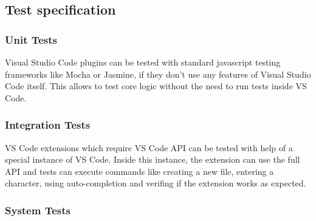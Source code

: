 \subsection{Test specification}

\subsubsection{Unit Tests}
Visual Studio Code plugins can be tested with standard javascript testing frameworks like Mocha or Jasmine, if they don't use any features of Visual Studio Code itself. This allows to test core logic without the need to run tests inside VS Code.


\subsubsection{Integration Tests}
VS Code extensions which require VS Code API can be tested with help of a special instance of VS Code. Inside this instance, the extension can use the full API and tests can execute commands like creating a new file, entering a character, using auto-completion and verifing if the extension works as expected.   


\subsubsection{System Tests}


